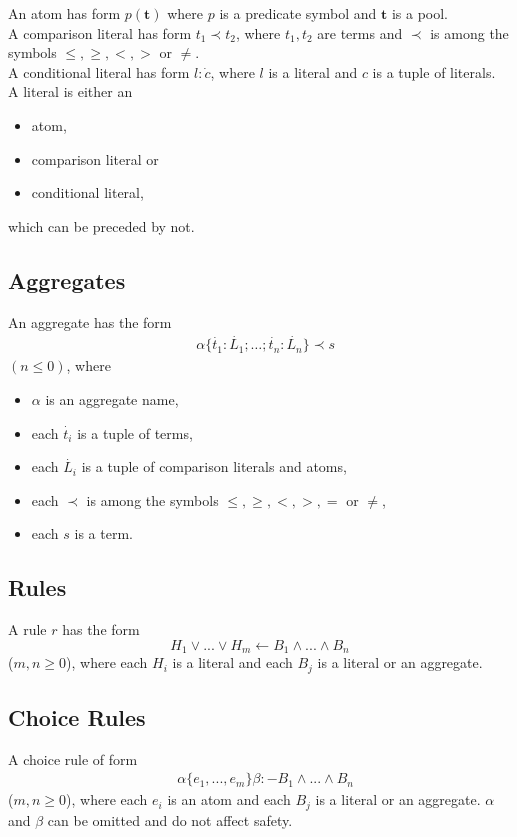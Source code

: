 \documentclass{article}
\newcommand{\pool}[1]{\boldsymbol{#1}}
\newcommand{\tuple}[1]{\dot{#1}}
\begin{document}
	An atom has form $p(\pool{t})$ where $p$ is a predicate symbol and $\pool{t}$ is a pool. 
	\\
	A comparison literal has form $t_1 \prec t_2$, where $t_1,t_2$ are terms and $\prec$ is among the symbols $\leq,\ge,<,>$ or $\neq$.
	\\
	A conditional literal has form $l : \tuple{c}$, where $l$ is a literal and $c$ is a tuple of literals.
	\\
	A literal is either an
	\begin{itemize}
		\item atom,
		\item comparison literal or
		\item conditional literal,
	\end{itemize}
	which can be preceded by not.

	\subsection{Aggregates}
	An aggregate has the form
	\begin{align}
		&\alpha\{\tuple{t_1} : \tuple{L_1}; \dots; \tuple{t_n} : \tuple{L_n}\} \prec s \label{aggregate1}
	\end{align}
	$(n \leq 0)$, where
	\begin{itemize}
		\item $\alpha$ is an aggregate name,
		\item each $\tuple{t_i}$ is a tuple of terms,
		\item each $\tuple{L_i}$ is a tuple of comparison literals and atoms,
		\item each $\prec$ is among the symbols $\leq,\ge,<,>,=$ or $\neq$,
		\item each $s$ is a term.
	\end{itemize}

	\subsection{Rules}

	A rule $r$ has the form
	\begin{equation}
		H_1 \lor ... \lor H_m  \leftarrow B_1 \land ... \land B_n \label{rule}
	\end{equation}
	($m, n \ge 0$), where each $H_i$ is a literal and each $B_j$ is a literal or an aggregate.

	\subsection{Choice Rules}
	A choice rule of form
	\begin{align}
		&\alpha\{e_1, ..., e_m\}\beta :- B_1 \land ... \land B_n \label{choice}
	\end{align}
	($m, n \ge 0$), where each $e_i$ is an atom and each $B_j$ is a literal or an aggregate. $\alpha$ and $\beta$ can be omitted and do not affect safety.
\end{document}
